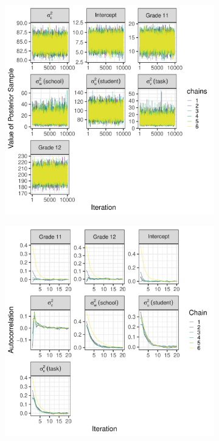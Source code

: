 \documentclass[a4paper]{article}
\begin{document}
\begin{figure}[!ht]
	\centering
	\begin{subfigure}{.5\textwidth}
		\centering
		\includegraphics[width=\linewidth]{traceplotsBaseline}
	\end{subfigure}%
	\begin{subfigure}{.5\textwidth}
		\centering
		\includegraphics[width=\linewidth]{autocorrelationBaseline}

\end{subfigure}
\end{figure}
\end{document}

